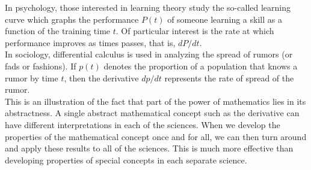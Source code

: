 \documentclass{book}
\begin{document}
In psychology, those interested in learning theory study the so-called learning curve which graphs the performance $P(t)$ of someone learning a skill as a function of the training time $t$. Of particular interest is the rate at which performance improves as times passes, that is, $dP/dt$.\\

In sociology, differential calculus is used in analyzing the spread of rumors (or fads or fashions). If $p(t)$ denotes the proportion of a population that knows a rumor by time $t$, then the derivative $dp/dt$ represents the rate of spread of the rumor.\\

This is an illustration of the fact that part of the power of mathematics lies in its abstractness. A single abstract mathematical concept such as the derivative can have different interpretations in each of the sciences. When we develop the properties of the mathematical concept once and for all, we can then turn around and apply these results to all of the sciences. This is much more effective than developing properties of special concepts in each separate science. 

\vfill
{}
\pagebreak
\end{document}
